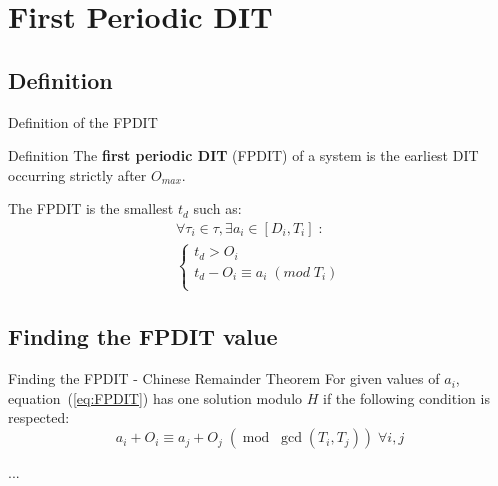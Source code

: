 \documentclass{beamer}
\begin{document}
\section{First Periodic DIT}

    \begin{frame}
    \end{frame}

	\subsection{Definition}

	\begin{frame}{Definition of the FPDIT}
		\begin{block}{Definition}
			The \textbf{first periodic DIT} (FPDIT) of a system is the earliest DIT occurring
			strictly after $O_{max}$.
		\end{block}

        The FPDIT is the smallest $t_d$ such as:
       \begin{equation}
            \begin{array}{l}
                \forall \tau_i \in \tau, \exists a_i \in [D_i,T_i] \; :\\
                \left\{
                    \begin{array}{l}
                        t_d > O_i \\
                        t_d - O_i \equiv a_i \; (mod \; T_i)
                        \\
                    \end{array}
                \right.
            \end{array}
            \label{eq:FPDIT}
        \end{equation}

	\end{frame}

	\subsection{Finding the FPDIT value}

    \begin{frame}{Finding the FPDIT - Chinese Remainder Theorem}
        For given values of $a_i$, equation~(\ref{eq:FPDIT}) has one solution modulo $H$ if the following condition is respected:
        \[
            a_i + O_i \equiv a_j + O_j \; (\operatorname{mod} \; \operatorname{gcd}(T_i,
            T_j)) \; \forall i,j
        \]

        ...
    \end{frame}
\end{document}
